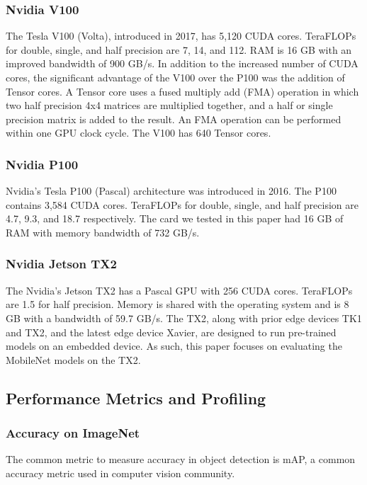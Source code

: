 \documentclass[conference]{IEEEtran}
\begin{document}
\subsubsection{Nvidia V100}

The Tesla V100 (Volta), introduced in 2017, has 5,120 CUDA cores. TeraFLOPs for double, single, and half precision are 7, 14, and 112. RAM is 16 GB with an improved bandwidth of 900 GB/s. In addition to the increased number of CUDA cores, the significant advantage of the V100 over the P100 was the addition of Tensor cores. A Tensor core uses a fused multiply add (FMA) operation in which two half precision 4x4 matrices are multiplied together, and a half or single precision matrix is added to the result. An FMA operation can be performed within one GPU clock cycle. The V100 has 640 Tensor cores.

\subsubsection{Nvidia P100}

Nvidia's Tesla P100 (Pascal) architecture was introduced in 2016. The P100 contains 3,584 CUDA cores. TeraFLOPs for double, single, and half precision are 4.7, 9.3, and 18.7 respectively. The card we tested in this paper had 16 GB of RAM with memory bandwidth of  732 GB/s.


\subsubsection{Nvidia Jetson TX2}

The Nvidia's Jetson TX2 has a Pascal GPU with 256 CUDA cores. TeraFLOPs are 1.5 for half precision. Memory is shared with the operating system and is 8 GB with a bandwidth of 59.7 GB/s.
The TX2, along with prior edge devices TK1 and TX2, and the latest edge device Xavier, are designed to run pre-trained models on an embedded device. As such, this paper focuses on evaluating the MobileNet models on the TX2.

\subsection{Performance Metrics and Profiling}

\subsubsection{Accuracy on ImageNet}
The common metric to measure accuracy in object detection is mAP, a common accuracy metric used in computer vision community.
\end{document}
